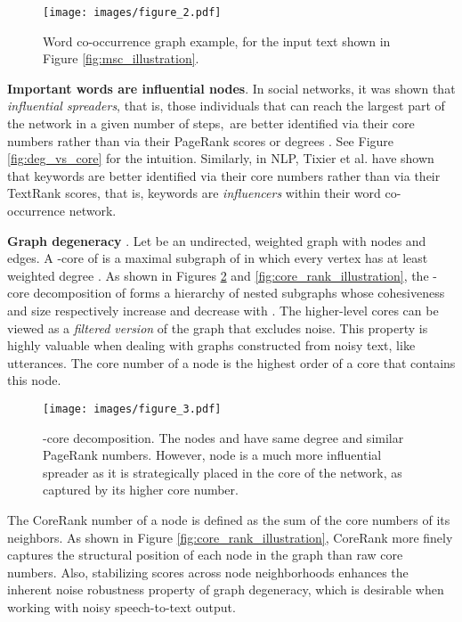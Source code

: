\documentclass[11pt,a4paper]{article}
\begin{document}
\begin{figure}[ht]
\centering
\captionsetup{size=small}
\texttt{[image: images/figure\_2.pdf]}
\caption{
Word co-occurrence graph example, for the input text shown in Figure \ref{fig:msc_illustration}.
}
\label{fig:gow_illustration}
\end{figure}

\noindent \textbf{Important words are influential nodes}. In social networks, it was shown that \textit{influential spreaders}, that is, those individuals that can reach the largest part of the network in a given number of steps,~are better identified via their core numbers rather than via their PageRank scores or degrees \cite{kitsak2010identification}. See Figure \ref{fig:deg_vs_core} for the intuition. Similarly, in NLP, Tixier et al.  have shown that keywords are better identified via their core numbers rather than via their TextRank scores, that is, keywords are \textit{influencers} within their word co-occurrence network.

\noindent \textbf{Graph degeneracy} \cite{seidman1983network}. 
Let  be an undirected, weighted graph with  nodes and  edges. A -core of  is a maximal subgraph of  in which every vertex  has at least weighted degree . As shown in Figures \ref{fig:kcore} and \ref{fig:core_rank_illustration}, the -core decomposition of  forms a hierarchy of nested subgraphs whose cohesiveness and size respectively increase and decrease with . The higher-level cores can be viewed as a \textit{filtered version} of the graph that excludes noise. This property is highly valuable when dealing with graphs constructed from noisy text, like utterances.
The core number of a node is the highest order of a core that contains this node.

\begin{figure}[ht]
    \centering
    \captionsetup{size=small}
    \texttt{[image: images/figure\_3.pdf]}
	\caption{-core decomposition. The nodes  and  have same degree and similar PageRank numbers. However, node  is a much more influential spreader as it is strategically placed in the core of the network, as captured by its higher core number.\label{fig:deg_vs_core}}
    \label{fig:kcore}
\end{figure}

The CoreRank number of a node \cite{tixier2016graph,bae2014identifying} is defined as the sum of the core numbers of its neighbors. As shown in Figure \ref{fig:core_rank_illustration}, CoreRank more finely captures the structural position of each node in the graph than raw core numbers. Also, stabilizing scores across node neighborhoods enhances the inherent noise robustness property of graph degeneracy, which is desirable when working with noisy speech-to-text output.
\end{document}
